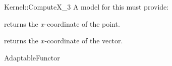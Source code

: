 \begin{ccRefFunctionObjectConcept}{Kernel::ComputeX_3}
A model for this must provide:


       {returns the $x$-coordinate of the point.}

       {returns the $x$-coordinate of the vector.}

\ccRefines
AdaptableFunctor



\end{ccRefFunctionObjectConcept}
